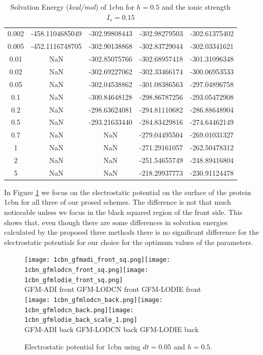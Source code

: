 \begin{table}[!ht]
\begin{tabular}{c c c c c }
0.002 & -458.1104685049 & -302.99808443  & -302.98279503   & -302.61375402 \\
0.005 & -452.1116748705 & -302.90138868  & -302.83729044   & -302.03341621   \\
0.01  &    NaN         & -302.85075766   & -302.68957418   & -301.31096348   \\
0.02  &    NaN         & -302.69227062   & -302.33466174   & -300.06953533   \\
0.05  &    NaN          & -302.04538862   & -301.08386563   & -297.04896758   \\
0.1   &    NaN          & -300.84648128   & -298.86787256   & -293.05472908   \\
0.2   &    NaN           & -298.63624081   & -294.81110682   & -286.88648904   \\
0.5   &    NaN          & -293.21633440   & -284.83429816   & -274.64462149   \\
0.7   &   NaN           & NaN             & -279.04495504   & -269.01031327   \\
1     &     NaN         & NaN             & -271.29161057   & -262.50478312   \\
2     &    NaN          & NaN             & -251.54655749   & -248.89416804   \\
5     &    NaN           & NaN             & -218.29937773   & -230.91124478 \\ \hline
\end{tabular}
\caption{Solvation Energy ({\it kcal/mol}) of 1cbn for $h=0.5$ and the ionic strength $I_s= 0.15$}
\label{tab-1cbn}
\end{table}
 
   

In Figure \ref{fig_1cbn} we focus on the electrostatic potential on the surface of the protein 1cbn for all three of our prosed schemes.  The difference is not that much noticeable unless we focus in the black squared region of the front side. This shows that, even though there are some differences in solvation energies calculated by the proposed three methods there is no significant difference for the electrostatic potentials for our choice for the optimum values of the parameters.      
\begin{figure}[!ht]
\begin{center}	
	\texttt{[image: 1cbn\_gfmadi\_front\_sq.png]}\texttt{[image: 1cbn\_gfmlodcn\_front\_sq.png]}\texttt{[image: 1cbn\_gfmlodie\_front\_sq.png]}\\
GFM-ADI front \hskip 0.7in GFM-LODCN front \hskip 0.7in GFM-LODIE front\\
	\texttt{[image: 1cbn\_gfmlodcn\_back.png]}\texttt{[image: 1cbn\_gfmlodcn\_back.png]}\texttt{[image: 1cbn\_gfmlodie\_back\_scale\_1.png]}\\
  GFM-ADI back \hskip 0.7in GFM-LODCN back \hskip 0.7in GFM-LODIE back\\
	\caption{Electrostatic potential for 1cbn using $dt = 0.05$ and $h= 0.5$. }
\label{fig_1cbn}
\end{center}
\end{figure}

